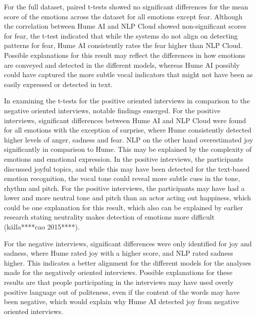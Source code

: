 For the full dataset, paired t-tests showed no significant differences for the mean score of the emotions across the dataset for all emotions except fear. Although the correlation between Hume AI and NLP Cloud showed non-significant scores for fear, the t-test indicated that while the systems do not align on detecting patterns for fear, Hume AI consistently rates the fear higher than NLP Cloud. Possible explanations for this result may reflect the differences in how emotions are conveyed and detected in the different models, whereas Hume AI possibly could have captured the more subtle vocal indicators that might not have been as easily expressed or detected in text.

In examining the t-tests for the positive oriented interviews in comparison to the negative oriented interviews, notable findings emerged. For the positive interviews, significant differences between Hume AI and NLP Cloud were found for all emotions with the exception of surprise, where Hume consistently detected higher levels of anger, sadness and fear. NLP on the other hand overestimated joy significantly in comparison to Hume. 
This may be explained by the complexity of emotions and emotional expression. In the positive interviews, the participants discussed joyful topics, and while this may have been detected for the text-based emotion recognition, the vocal tone could reveal more subtle cues in the tone, rhythm and pitch. For the positive interviews, the participants may have had a lower and more neutral tone and pitch than an actor acting out happiness, which could be one explanation for this result, which also can be explained by earlier research stating neutrality makes detection of emotions more difficult  (källa****cao 2015****).

For the negative interviews, significant differences were only identified for joy and sadness, where Hume rated joy with a higher score, and NLP rated sadness higher. This indicates a better alignment for the different models for the analyses made for the negatively oriented interviews. Possible explanations for these results are that people participating in the interviews may have used overly positive language out of politeness, even if the content of the words may have been negative, which would explain why Hume AI detected joy from negative oriented interviews.
